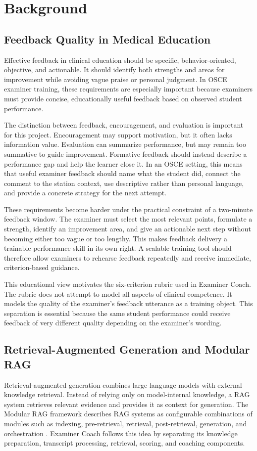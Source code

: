 \section{Background}

\subsection{Feedback Quality in Medical Education}
Effective feedback in clinical education should be specific, behavior-oriented,
objective, and actionable. It should identify both strengths and areas for
improvement while avoiding vague praise or personal judgment. In OSCE examiner
training, these requirements are especially important because examiners must
provide concise, educationally useful feedback based on observed student
performance.

The distinction between feedback, encouragement, and evaluation is important for
this project. Encouragement may support motivation, but it often lacks
information value. Evaluation can summarize performance, but may remain too
summative to guide improvement. Formative feedback should instead describe a
performance gap and help the learner close it. In an OSCE setting, this means
that useful examiner feedback should name what the student did, connect the
comment to the station context, use descriptive rather than personal language,
and provide a concrete strategy for the next attempt.

These requirements become harder under the practical constraint of a two-minute
feedback window. The examiner must select the most relevant points, formulate a
strength, identify an improvement area, and give an actionable next step without
becoming either too vague or too lengthy. This makes feedback delivery a
trainable performance skill in its own right. A scalable training tool should
therefore allow examiners to rehearse feedback repeatedly and receive immediate,
criterion-based guidance.

This educational view motivates the six-criterion rubric used in Examiner
Coach. The rubric does not attempt to model all aspects of clinical competence.
It models the quality of the examiner's feedback utterance as a training object.
This separation is essential because the same student performance could receive
feedback of very different quality depending on the examiner's wording.

\subsection{Retrieval-Augmented Generation and Modular RAG}
Retrieval-augmented generation combines large language models with external
knowledge retrieval. Instead of relying only on model-internal knowledge, a RAG
system retrieves relevant evidence and provides it as context for generation.
The Modular RAG framework describes RAG systems as configurable combinations of
modules such as indexing, pre-retrieval, retrieval, post-retrieval, generation,
and orchestration \cite{gao2024modularrag}. Examiner Coach follows this idea by
separating its knowledge preparation, transcript processing, retrieval, scoring,
and coaching components.

